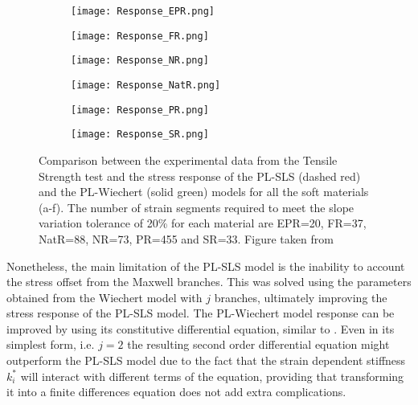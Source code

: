\begin{figure}[htb!]
	\centering
    \begin{subfigure}[b]{0.49\textwidth}
        \centering
        \texttt{[image: Response\_EPR.png]}
        \caption{}
        \label{fig:ResponseEPR}
    \end{subfigure}
    \begin{subfigure}[b]{0.49\textwidth}
        \centering
        \texttt{[image: Response\_FR.png]}
        \caption{}
        \label{fig:ResponseFR}
    \end{subfigure}
    \begin{subfigure}[b]{0.49\textwidth}
        \centering
        \texttt{[image: Response\_NR.png]}
        \caption{}
        \label{fig:ResponseNR}
    \end{subfigure}
    \begin{subfigure}[b]{0.49\textwidth}
        \centering
        \texttt{[image: Response\_NatR.png]}
        \caption{}
        \label{fig:ResponseNatR}
    \end{subfigure}  
    \begin{subfigure}[b]{0.49\textwidth}
        \centering
        \texttt{[image: Response\_PR.png]}
        \caption{}
        \label{fig:ResponsePR}
    \end{subfigure}  
    \begin{subfigure}[b]{0.49\textwidth}
        \centering
        \texttt{[image: Response\_SR.png]}
        \caption{}
        \label{fig:ResponseSR}
    \end{subfigure}  
    \caption{Comparison between the experimental data from the Tensile Strength test and the stress response of the PL-SLS (dashed red) and the PL-Wiechert (solid green) models for all the soft materials (a-f). The number of strain segments required to meet the slope variation tolerance of 20\% for each material are EPR=20, FR=37, NatR=88, NR=73, PR=455 and SR=33. Figure taken from \cite{solis2018assessment}}
    \label{fig:ResponseAll}
\end{figure}

Nonetheless, the main limitation of the PL-SLS model is the inability to account the stress offset from the Maxwell branches. This was solved using the parameters obtained from the Wiechert model with $j$ branches, ultimately improving the stress response of the PL-SLS model. The PL-Wiechert model response can be improved by using its constitutive differential equation, similar to . Even in its simplest form, i.e. $j=2$ the resulting second order differential equation might outperform the PL-SLS model due to the fact that the strain dependent stiffness $k_i^*$ will interact with different terms of the equation, providing that transforming it into a finite differences equation does not add extra complications.

